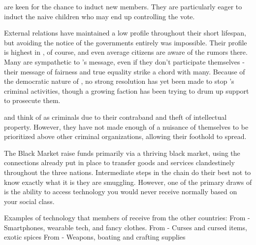 \documentclass[blue]{GL2020}
\begin{document}
\pCult{} are keen for the chance to induct new members. They are particularly eager to induct the naive children who may end up controlling the vote.


External relations
\pCult{} have maintained a low profile throughout their short lifespan, but avoiding the notice of the governments entirely was impossible. Their profile is highest in \pViking{}, of course, and even average citizens are aware of the rumors there. Many \pViking{\people} are sympathetic to \cCult{}'s message, even if they don’t participate themselves - their message of fairness and true equality strike a chord with many.  Because of the democratic nature of \pViking{}, no strong resolution has yet been made to stop \pCult{}'s criminal activities, though a growing faction has been trying to drum up support to prosecute them.


\pTech{} and \pFarm{} think of \pCult{} as criminals due to their contraband and theft of intellectual property. However, they have not made enough of a nuisance of themselves to be prioritized above other criminal organizations, allowing their foothold to spread.

The Black Market
\pCult{} raise funds primarily via a thriving black market, using the connections already put in place to transfer goods and services clandestinely throughout the three nations. Intermediate steps in the chain do their best not to know exactly what it is they are smuggling. However, one of the primary draws of \pCult{} is the ability to access technology you would never receive normally based on your social class. 

Examples of technology that members of \pCult{} receive from the other countries:
From \pTech{} - Smartphones, wearable tech, and fancy clothes.
From \pFarm{} - Curses and cursed items, exotic spices
From \pViking{} - Weapons, boating and crafting supplies
\end{document}
